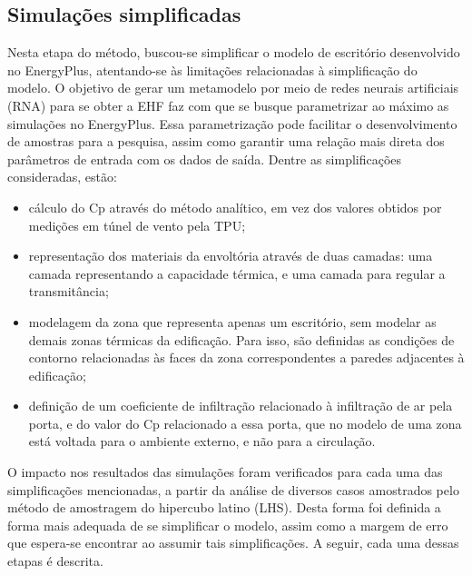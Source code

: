 \documentclass[brazil,hardcopy,openany,a5paper]{ufscthesis}
\begin{document}
		
		\subsection{Simulações simplificadas}
		
		Nesta etapa do método, buscou-se simplificar o modelo de escritório desenvolvido no EnergyPlus, atentando-se às limitações relacionadas à simplificação do modelo.
		O objetivo de gerar um metamodelo por meio de redes neurais artificiais (RNA) para se obter a EHF faz com que se busque parametrizar ao máximo as simulações no EnergyPlus.
		Essa parametrização pode facilitar o desenvolvimento de amostras para a pesquisa, assim como garantir uma relação mais direta dos parâmetros de entrada com os dados de saída. 
		Dentre as simplificações consideradas, estão:
		
		\begin{itemize}
		\item cálculo do Cp através do método analítico, em vez dos valores obtidos por medições em túnel de vento pela TPU;
		\item representação dos materiais da envoltória através de duas camadas: uma camada representando a capacidade térmica, e uma camada para regular a transmitância;  %
		\item modelagem da zona que representa apenas um escritório, sem modelar as demais zonas térmicas da edificação. Para isso, são definidas as condições de contorno relacionadas às faces da zona correspondentes a paredes adjacentes à edificação;
		\item definição de um coeficiente de infiltração relacionado à infiltração de ar pela porta, e do valor do Cp relacionado a essa porta, que no modelo de uma zona está voltada para o ambiente externo, e não para a circulação.
		\end{itemize}
		
		O impacto nos resultados das simulações foram verificados para cada uma das simplificações mencionadas, a partir da análise de diversos casos amostrados pelo método de amostragem do hipercubo latino (LHS). Desta forma foi definida a forma mais adequada de se simplificar o modelo, assim como a margem de erro que espera-se encontrar ao assumir tais simplificações.
		A seguir, cada uma dessas etapas é descrita.
		
\end{document}
